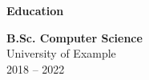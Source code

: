 \begin{tcolorbox}[vercelcard]
\textcolor{DockerBlue}{\large\textbf{Education}}

\vspace{8pt}

\textbf{B.Sc. Computer Science} \\
\textcolor{body}{University of Example} \\
\textcolor{DockerGray}{\small 2018 -- 2022}

\end{tcolorbox}
